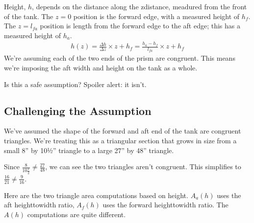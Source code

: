 \documentclass[letterpaper,10pt,english]{sphinxmanual}
\begin{document}
\sphinxAtStartPar
Height, \(h\), depends on the distance along the z\sphinxhyphen{}distance, meadured from the front of the tank.
The \(z=0\) position is the forward edge, with a measured height of \(h_f\).
The \(z=l_{fa}\) position is length from the forward edge to the aft edge; this has a measured height of \(h_a\).
\begin{equation*}
\begin{split}
h(z) = \frac{\Delta h}{\Delta z} \times z + h_f  = \frac{h_a-h_f}{l_{fa}} \times z + h_f
\end{split}
\end{equation*}
\sphinxAtStartPar
We’re assuming each of the two ends of the prism are congruent. This means we’re imposing the aft width and height on the tank as a whole.

\sphinxAtStartPar
Is this a safe assumption? Spoiler alert: it isn’t.


\subsection{Challenging the Assumption}
\label{\detokenize{prism-irregular:challenging-the-assumption}}
\sphinxAtStartPar
We’ve assumed the shape of the forward and aft end of the tank are congruent triangles.
We’re treating this as a triangular section that grows in size from a small 8” by 10½” triangle
to a large 27” by 48” triangle.

\sphinxAtStartPar
Since \(\frac{8}{10 \tfrac{1}{2}} \neq \frac{27}{48}\), we can see the two triangles aren’t congruent. This simplifies to \(\frac{16}{21} \neq \frac{9}{16}\).

\sphinxAtStartPar
Here are the two triangle area computations based on height. \(A_a(h)\) uses the aft height\sphinxhyphen{}to\sphinxhyphen{}width ratio,
\(A_f(h)\) uses the forward height\sphinxhyphen{}to\sphinxhyphen{}width ratio. The \(A(h)\) computations are quite different.

\begin{sphinxVerbatim}[commandchars=\\\{\}]
    
    

       
       
\end{sphinxVerbatim}
\end{document}
